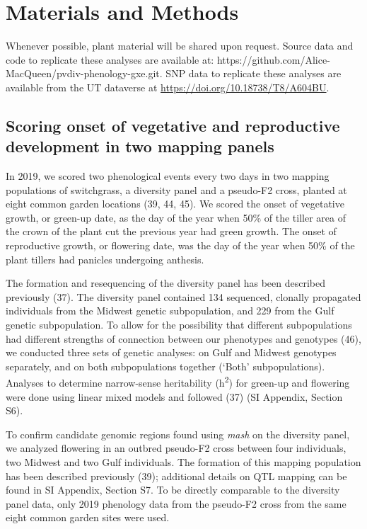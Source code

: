 \documentclass[
  9pt,
  twocolumn,
  twoside]{pnas-new}
\begin{document}
\section{Materials and Methods}\label{materials-and-methods}

Whenever possible, plant material will be shared upon request. Source
data and code to replicate these analyses are available at:
https://github.com/Alice-MacQueen/pvdiv-phenology-gxe.git. SNP data to
replicate these analyses are available from the UT dataverse at
\url{https://doi.org/10.18738/T8/A604BU}.

\subsection{Scoring onset of vegetative and reproductive development in
two mapping
panels}\label{scoring-onset-of-vegetative-and-reproductive-development-in-two-mapping-panels}

In 2019, we scored two phenological events every two days in two mapping
populations of switchgrass, a diversity panel and a pseudo-F2 cross,
planted at eight common garden locations (39, 44, 45). We scored the
onset of vegetative growth, or green-up date, as the day of the year
when 50\% of the tiller area of the crown of the plant cut the previous
year had green growth. The onset of reproductive growth, or flowering
date, was the day of the year when 50\% of the plant tillers had
panicles undergoing anthesis.

The formation and resequencing of the diversity panel has been described
previously (37). The diversity panel contained 134 sequenced, clonally
propagated individuals from the Midwest genetic subpopulation, and 229
from the Gulf genetic subpopulation. To allow for the possibility that
different subpopulations had different strengths of connection between
our phenotypes and genotypes (46), we conducted three sets of genetic
analyses: on Gulf and Midwest genotypes separately, and on both
subpopulations together (`Both' subpopulations). Analyses to determine
narrow-sense heritability (h\textsuperscript{2}) for green-up and
flowering were done using linear mixed models and followed (37) (SI
Appendix, Section S6).

To confirm candidate genomic regions found using \emph{mash} on the
diversity panel, we analyzed flowering in an outbred pseudo-F2 cross
between four individuals, two Midwest and two Gulf individuals. The
formation of this mapping population has been described previously (39);
additional details on QTL mapping can be found in SI Appendix, Section
S7. To be directly comparable to the diversity panel data, only 2019
phenology data from the pseudo-F2 cross from the same eight common
garden sites were used.
\end{document}
